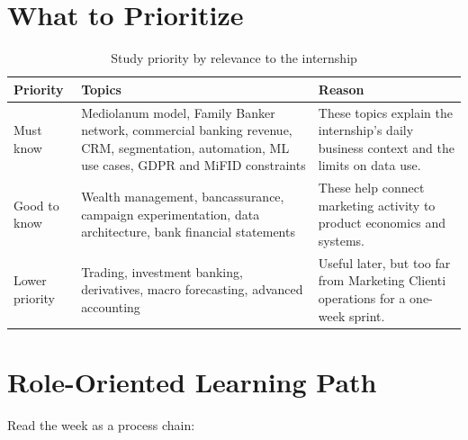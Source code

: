 \documentclass[
	11pt,
	fleqn,
	a4paper,
	oneside,
]{LegrandOrangeBook}
\begin{document}
\section{What to Prioritize}

\begin{table}[H]
	\centering
	\begin{tabularx}{\textwidth}{L{0.18\textwidth} Y Y}
		\toprule
		\textbf{Priority} & \textbf{Topics} & \textbf{Reason}\\
		\midrule
		Must know & Mediolanum model, Family Banker network, commercial banking revenue, CRM, segmentation, automation, ML use cases, GDPR and MiFID constraints & These topics explain the internship's daily business context and the limits on data use.\\
		Good to know & Wealth management, bancassurance, campaign experimentation, data architecture, bank financial statements & These help connect marketing activity to product economics and systems.\\
		Lower priority & Trading, investment banking, derivatives, macro forecasting, advanced accounting & Useful later, but too far from Marketing Clienti operations for a one-week sprint.\\
		\bottomrule
	\end{tabularx}
	\caption{Study priority by relevance to the internship}
\end{table}

\section{Role-Oriented Learning Path}

Read the week as a process chain:

\begin{center}
\end{center}
\end{document}
